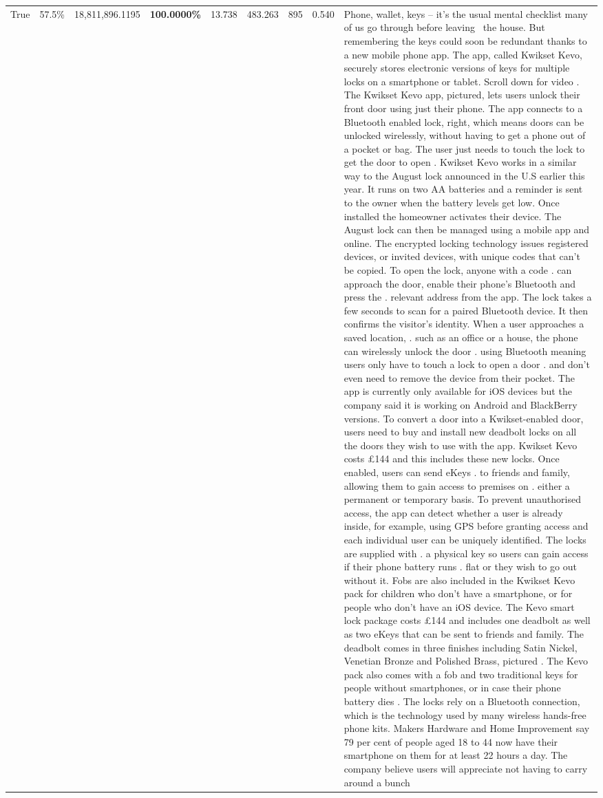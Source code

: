 \begin{table}[H]
\begin{tabular}{lllrlllll}
True & 57.5\% & 18,811,896.1195 & \bfseries \color{red} 100.0000\% & 13.738 & 483.263 & 895 & 0.540 & Phone, wallet, keys – it’s the usual mental checklist many of us go through before leaving  the house. But remembering the keys could soon be redundant thanks to a new mobile phone app. The app, called Kwikset Kevo, securely stores electronic versions of keys for multiple locks on a smartphone or tablet. Scroll down for video . The Kwikset Kevo app, pictured, lets users unlock their front door using just their phone. The app connects to a Bluetooth enabled lock, right, which means doors can be unlocked wirelessly, without having to get a phone out of a pocket or bag. The user just needs to touch the lock to get the door to open . Kwikset Kevo works in a similar way to the August lock announced in the U.S earlier this year. It runs on two AA batteries and a reminder is sent to the owner when the battery levels get low. Once installed the homeowner activates their device. The August lock can then be managed using a mobile app and online. The encrypted locking technology issues registered devices, or invited devices, with unique codes that can't be copied. To open the lock, anyone with a code . can approach the door, enable their phone's Bluetooth and press the . relevant address from the app. The lock takes a few seconds to scan for a paired Bluetooth device. It then confirms the visitor's identity. When a user approaches a saved location, . such as an office or a house, the phone can wirelessly unlock the door . using Bluetooth meaning users only have to touch a lock to open a door . and don't even need to remove the device from their pocket. The app is currently only available for iOS devices but the company said it is working on Android and BlackBerry versions. To convert a door into a Kwikset-enabled door, users need to buy and install new deadbolt locks on all the doors they wish to use with the app. Kwikset Kevo costs £144 and this includes these new locks. Once enabled, users can send eKeys . to friends and family, allowing them to gain access to premises on . either a permanent or temporary basis. To prevent unauthorised access, the app can detect whether a user is already inside, for example, using GPS before granting access and each individual user can be uniquely identified. The locks are supplied with . a physical key so users can gain access if their phone battery runs . flat or they wish to go out without it. Fobs are also included in the Kwikset Kevo pack for children who don't have a smartphone, or for people who don't have an iOS device. The Kevo smart lock package costs £144 and includes one deadbolt as well as two eKeys that can be sent to friends and family. The deadbolt comes in three finishes including Satin Nickel, Venetian Bronze and Polished Brass, pictured . The Kevo pack also comes with a fob and two traditional keys for people without smartphones, or in case their phone battery dies . The locks rely on a Bluetooth connection, which is the technology used by many wireless hands-free phone kits. Makers Hardware and Home Improvement say 79 per cent of people aged 18 to 44 now have their smartphone on them for at least 22 hours a day. The company believe users will appreciate not having to carry around a bunch 
\end{tabular}
\end{table}
